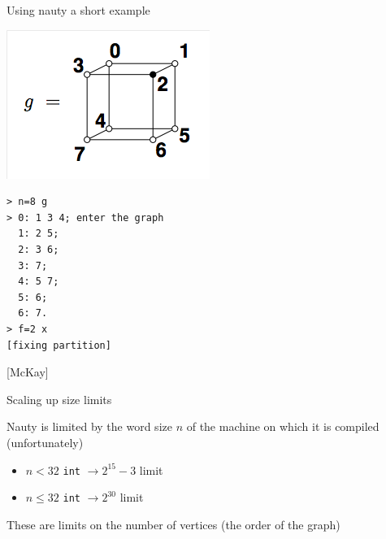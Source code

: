 \documentclass{beamer}
\begin{document}

\begin{frame}[fragile] {Using nauty}
{a short example}

\begin{center}
\includegraphics[scale=0.3]{dreadnautExample.png}
\end{center}

\bigskip

\begin{lstlisting}[frame=single]
> n=8 g
> 0: 1 3 4; enter the graph
  1: 2 5;
  2: 3 6;
  3: 7;
  4: 5 7;
  5: 6;
  6: 7. 
> f=2 x
[fixing partition]
\end{lstlisting}
[McKay]

\end{frame}


\begin{frame}[fragile] {Scaling up}
{size limits}

Nauty is limited by the word size $n$ of the machine on which it is compiled (unfortunately)

\bigskip

\begin{itemize}
\item 
$n < 32$ {\tt int} $\to 2^{15} - 3$ limit
\item 
$n \leq 32$ {\tt int} $\to 2^{30}$ limit
\end{itemize}

These are limits on the number of vertices (the order of the graph)

\end{frame}

\end{document}
